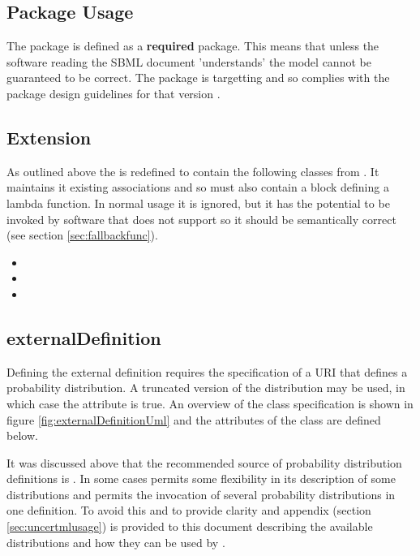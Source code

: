 \documentclass[draftspec]{sbmlpkgspec}
\begin{document}
\subsection{Package Usage}

The \distrib package is defined as a \textbf{required} package. This
means that unless the software reading the SBML document 'understands'
\distribshort the model cannot be guaranteed to be correct. The
package is targetting \sbmlverone and so complies with the package
design guidelines for that version \cite{sbmll3v1packrule}.

\subsection{\FunctionDefinition Extension}

As outlined above the \FunctionDefinition is redefined to contain the
following classes from \distribshort. It maintains it existing
associations and so must also contain a \mathml block defining a
lambda function. In normal usage it is ignored, but it has the
potential to be invoked by software that does not support \distribshort
so it should be semantically correct (see section \ref{sec:fallbackfunc}).

\begin{itemize}
  \item {}
  \item {}
  \item {}
\end{itemize}

\subsection{externalDefinition}
\label{sec:extlDefnDistn}

Defining the external definition requires the specification of a URI
that defines a probability distribution. A truncated version of the
distribution may be used, in which case the 
attribute is true. An overview of the class specification is shown in
figure \ref{fig:externalDefinitionUml} and the attributes of the class
are defined below.

It was discussed above that the recommended source of probability
distribution definitions is \uncertml. In some cases \uncertml permits
some flexibility in its description of some distributions and permits
the invocation of several probability distributions in one
definition. To avoid this and to provide clarity and appendix (section
\ref{sec:uncertmlusage}) is provided to this document describing the
available distributions and how they can be used by \distribshort.
\end{document}
